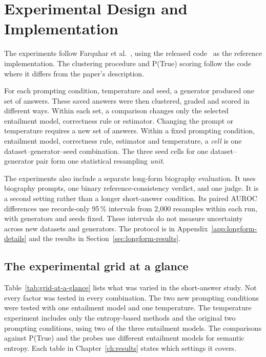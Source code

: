 \chapter{Experimental Design and Implementation}
\label{ch:experimental_design}

The experiments follow Farquhar et al.~\cite{semantic_entropy_nature_2024},
using the released code~\cite{kossen_semantic_uncertainty_code_2024} as the
reference implementation. The clustering procedure and P(True) scoring follow
the code where it differs from the paper's description.

For each prompting condition, temperature and seed, a generator produced one
set of answers. These saved answers were then clustered, graded and scored in
different ways. Within each set, a comparison changes only the selected
entailment model, correctness rule or estimator. Changing the prompt or
temperature requires a new set of answers.
Within a fixed prompting condition, entailment model, correctness rule,
estimator and temperature, a \emph{cell} is one dataset--generator--seed
combination. The three seed cells for one dataset--generator pair form one
statistical resampling \emph{unit}.

The experiments also include a separate long-form biography evaluation. It uses
biography prompts, one binary reference-consistency verdict, and one judge. It
is a second setting rather than a longer short-answer condition. Its paired
AUROC differences use records-only 95\,\% intervals from 2{,}000 resamples
within each run, with generators and seeds fixed. These intervals do not
measure uncertainty across new datasets and generators. The protocol is in
Appendix~\ref{app:longform-details} and the results in
Section~\ref{sec:longform-results}.

\section{The experimental grid at a glance}
\label{sec:grid-at-a-glance}

Table~\ref{tab:grid-at-a-glance} lists what was varied in the short-answer study.
Not every factor was tested in every combination. The two new prompting
conditions were tested with one entailment model and one temperature. The
temperature experiment includes only the entropy-based methods and the original two prompting conditions, using
two of the three entailment models. The comparisons against P(True) and the
probes use different entailment models for semantic entropy. Each table in
Chapter~\ref{ch:results} states which settings it covers.

